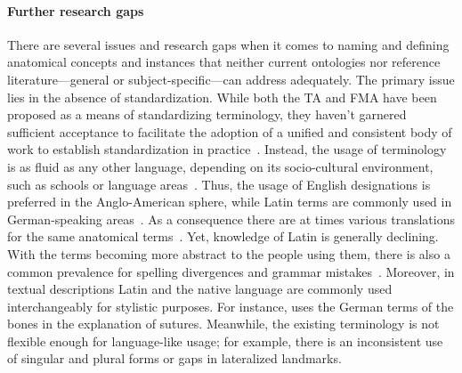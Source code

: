 \documentclass[sw]{iosart2x}
\begin{document}
\paragraph{Further research gaps}\label{sec:gaps+}
There are several issues and research gaps when it comes to naming and defining anatomical concepts and instances that neither current ontologies nor reference literature---general or subject-specific---can address adequately.
%
The primary issue lies in the absence of standardization.
While both the TA and FMA have been proposed as a means of standardizing terminology, they haven't garnered sufficient acceptance to facilitate the adoption of a unified and consistent body of work to establish standardization in practice~\citep{frequencyta,doestamatter,athighlights}.
Instead, the usage of terminology is as fluid as any other language, depending on its socio-cultural environment, such as schools or language areas~\citep{doestamatter,atthennow,atinfo,frequencyta,atcompare}.
Thus, the usage of English designations is preferred in the Anglo-American sphere, while Latin terms are commonly used in German-speaking areas~\citep{anatomycontribution,anatomylexicon,reforminganatomical}.
As a consequence there are at times various translations for the same anatomical terms~\citep{naminggame}.
Yet, knowledge of Latin is generally declining.
With the terms becoming more abstract to the people using them, there is also a common prevalence for spelling divergences and grammar mistakes~\citep{ta17,anatomylexicon,athighlights,diphthongs}.
Moreover, in textual descriptions Latin and the native language are commonly used interchangeably for stylistic purposes.
For instance, \cite{anatomylexicon} uses the German terms of the bones in the explanation of sutures.
Meanwhile, the existing terminology is not flexible enough for language-like usage; for example, there is an inconsistent use of singular and plural forms or gaps in lateralized landmarks.
\end{document}
